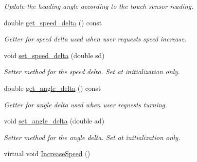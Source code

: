 \begin{DoxyCompactItemize}
\begin{DoxyCompactList}\small\item\em Update the heading angle according to the touch sensor reading. \end{DoxyCompactList}\item 
double \hyperlink{classMotionHandler_a7a9b503e3da267c7af25d58daff5f216}{get\+\_\+speed\+\_\+delta} () const \hypertarget{classMotionHandler_a7a9b503e3da267c7af25d58daff5f216}{}\label{classMotionHandler_a7a9b503e3da267c7af25d58daff5f216}

\begin{DoxyCompactList}\small\item\em Getter for speed delta used when user requests speed increase. \end{DoxyCompactList}\item 
void \hyperlink{classMotionHandler_a908b330346b3fe969684106bd5c7619d}{set\+\_\+speed\+\_\+delta} (double sd)\hypertarget{classMotionHandler_a908b330346b3fe969684106bd5c7619d}{}\label{classMotionHandler_a908b330346b3fe969684106bd5c7619d}

\begin{DoxyCompactList}\small\item\em Setter method for the speed delta. Set at initialization only. \end{DoxyCompactList}\item 
double \hyperlink{classMotionHandler_a67c945d11edc741af5c71c3596ead557}{get\+\_\+angle\+\_\+delta} () const \hypertarget{classMotionHandler_a67c945d11edc741af5c71c3596ead557}{}\label{classMotionHandler_a67c945d11edc741af5c71c3596ead557}

\begin{DoxyCompactList}\small\item\em Getter for angle delta used when user requests turning. \end{DoxyCompactList}\item 
void \hyperlink{classMotionHandler_a8c2811ddf1a0f077fec829c460009286}{set\+\_\+angle\+\_\+delta} (double ad)\hypertarget{classMotionHandler_a8c2811ddf1a0f077fec829c460009286}{}\label{classMotionHandler_a8c2811ddf1a0f077fec829c460009286}

\begin{DoxyCompactList}\small\item\em Setter method for the angle delta. Set at initialization only. \end{DoxyCompactList}\item 
virtual void \hyperlink{classMotionHandler_af6b91f5626075b09dba3d14177213622}{Increase\+Speed} ()\hypertarget{classMotionHandler_af6b91f5626075b09dba3d14177213622}{}\label{classMotionHandler_af6b91f5626075b09dba3d14177213622}


\end{DoxyCompactItemize}
